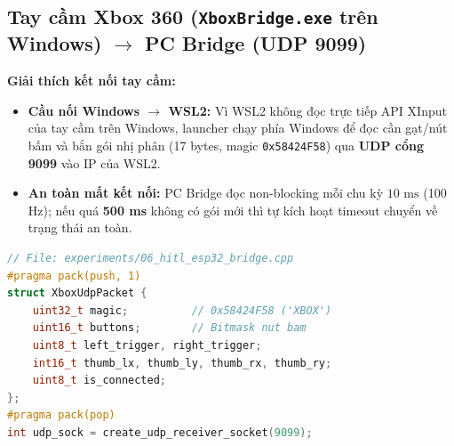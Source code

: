 \documentclass[11pt,a4paper]{article}
\begin{document}
\vspace{1em}

\subsection{Tay cầm Xbox 360 (\texttt{XboxBridge.exe} trên Windows) $\rightarrow$ PC Bridge (UDP 9099)}
\noindent
\begin{minipage}[t]{0.45\textwidth}
\vspace{0pt}
\textbf{Giải thích kết nối tay cầm:}
\begin{itemize}
    \item \textbf{Cầu nối Windows $\rightarrow$ WSL2:} Vì WSL2 không đọc trực tiếp API XInput của tay cầm trên Windows, launcher chạy  phía Windows để đọc cần gạt/nút bấm và bắn gói nhị phân  (17 bytes, magic \texttt{0x58424F58}) qua \textbf{UDP cổng 9099} vào IP của WSL2.
    \item \textbf{An toàn mất kết nối:} PC Bridge đọc non-blocking mỗi chu kỳ $10\text{ ms}$ (100 Hz); nếu quá \textbf{500 ms} không có gói mới thì tự kích hoạt timeout chuyển về trạng thái an toàn.
\end{itemize}
\end{minipage}
\hfill
\begin{minipage}[t]{0.52\textwidth}
\vspace{0pt}
\begin{lstlisting}[language=C++, firstnumber=50]
// File: experiments/06_hitl_esp32_bridge.cpp
#pragma pack(push, 1)
struct XboxUdpPacket {
    uint32_t magic;          // 0x58424F58 ('XBOX')
    uint16_t buttons;        // Bitmask nut bam
    uint8_t left_trigger, right_trigger;
    int16_t thumb_lx, thumb_ly, thumb_rx, thumb_ry;
    uint8_t is_connected;
};
#pragma pack(pop)
int udp_sock = create_udp_receiver_socket(9099);
\end{lstlisting}
\end{minipage}
\end{document}
